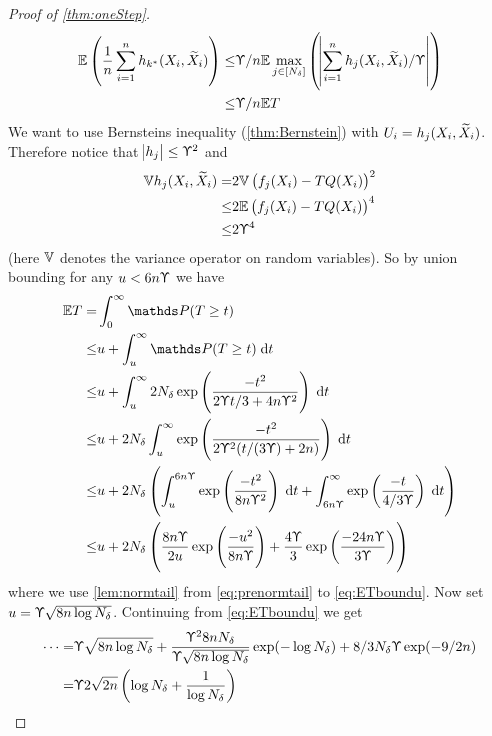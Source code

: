 \begin{proof}[Proof of \cref{thm:oneStep}]
  \begin{align}
    \mathbb{E} \left( \frac{1}{n} \sum_{i=1}^n h_{k^*}(X_i, \widetilde{X}_i) \right)
    \leq & \Upupsilon/n \mathbb{E} \max_{j \in [N_\delta]} \left(
    \abs{\sum_{i=1}^n h_j(X_i, \widetilde{X}_i)/\Upupsilon} \right)
    \\ \leq & \Upupsilon/n \mathbb{E} T 
    \label{eq:havgbound}
  \end{align}
  We want to use Bernsteins inequality (\cref{thm:Bernstein}) with
  $U_i = h_j(X_i,\widetilde{X}_i)$. Therefore notice that
  $\abs{h_j} \leq \Upupsilon^2$ and
  \begin{align}
    \mathbb{V} h_j(X_i, \widetilde{X}_i) = & 2 \mathbb{V} \left( f_j(X_i) - TQ(X_i) \right)^2
    \\ \leq & 2 \mathbb{E} \left( f_j(X_i) - TQ(X_i) \right)^4
    \\ \leq & 2 \Upupsilon^4
    \label{eq:hvarbound}
  \end{align}
  (here $\mathbb{V}$ denotes the variance operator on random variables).
  So by union bounding for any $u < 6 n \Upupsilon$ we have
  \begin{align}
    \E T = & \int_0^\infty \Prob(T \geq t)
    \\ \leq & u + \int_u^\infty \Prob(T \geq t) \difd t
    \\ \leq & u + \int_u^\infty 2 N_\delta
    \exp \left( \frac{-t^2}{2 \Yp t/3 + 4n \Yp^2} \right) \difd t
    \label{eq:smallmis}
    \\ \leq & u + 2 N_\delta \int_u^\infty 
    \exp \left( \frac{-t^2}{2 \Yp^2 (t/(3 \Yp) + 2 n )} \right) \difd t
    \\ \leq & u + 2 N_\delta \left(
      \int_u^{6 n \Yp} \exp \left( \frac{-t^2}{8 n \Yp^2} \right) \difd t
      + \int_{6 n \Yp}^\infty \exp \left( \frac{-t}{4/3 \Yp} \right) \difd t
    \right) 
    \label{eq:prenormtail}
    \\ \leq & u + 2 N_\delta \left(
      \frac{8 n \Yp}{2 u} \exp\left( \frac{-u^2}{8 n \Yp} \right)
      + \frac{4 \Yp}{3} \exp\left( \frac{-24 n \Yp}{3 \Yp} \right)
    \right) 
    \label{eq:ETboundu}
  \end{align}
  where we use \cref{lem:normtail}
  from \cref{eq:prenormtail} to \cref{eq:ETboundu}.
  Now set $u = \Upupsilon \sqrt{8 n \log N_\delta}$.
  Continuing from \cref{eq:ETboundu} we get
  \begin{align}
    \dots = & \Yp \sqrt{8 n \log N_\delta}
    + \frac{\Yp^2 8 n N_\delta}{\Yp \sqrt{8 n \log N_\delta}}
    \exp(-\log N_\delta) + 8/3 N_\delta \Yp \exp(-9/2 n)
    \\ = & \Yp 2 \sqrt{2n} \left( \log N_\delta + \frac{1}{\log N_\delta} \right)

\end{align}
\end{proof}
